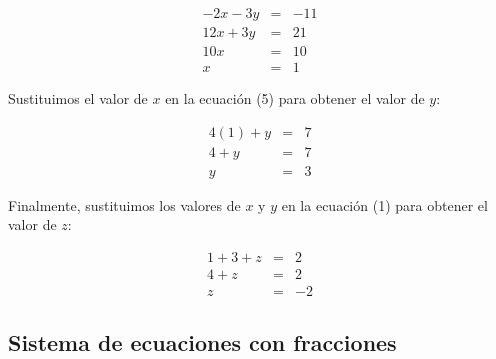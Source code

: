 \documentclass[12pt,addpoints]{repaso}
\begin{document}
\begin{questions}
{\begin{solutionbox}{18cm}
            \begin{eqnarray}
                -2x-3y&=&-11 \nonumber\\
                12x+3y&=&21 \nonumber\\ \hline
                10x&=&10 \nonumber\\
                x&=&1 \nonumber
            \end{eqnarray}
            
            Sustituimos el valor de $x$ en la ecuación (5) para obtener el valor de $y$:

            \begin{eqnarray}
                4(1)+y&=&7 \nonumber\\
                4+y&=&7 \nonumber\\
                y&=&3 \nonumber
            \end{eqnarray}

            Finalmente, sustituimos los valores de $x$ y $y$ en la ecuación (1) para obtener el valor de $z$:

            \begin{eqnarray}
                1+3+z&=&2 \nonumber\\
                4+z&=&2 \nonumber\\
                z&=&-2 \nonumber
            \end{eqnarray}
        \end{solutionbox}
    }

    \subsection{Sistema de ecuaciones con fracciones}
  
\end{questions}
\end{document}
